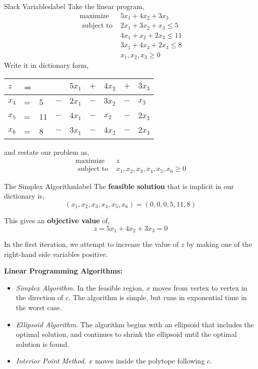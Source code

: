 	\begin{ex}{Slack Variables}{label}
		Take the linear program, 
		\[
		\begin{array}{cl}
		\operatorname{maximize} & 5 x_{1}+4 x_{2}+3 x_{3} \\
		\text { subject to } & 2 x_{1}+3 x_{2}+x_{3} \leq 5 \\
		& 4 x_{1}+x_{2}+2 x_{3} \leq 11 \\
		& 3 x_{1}+4 x_{2}+2 x_{3} \leq 8 \\
		& x_{1}, x_{2}, x_{3} \geq 0
		\end{array}
		\]
		\noindent Write it in dictionary form,

		\vphantom{.}

		\begin{center}
		\begin{tabular}{lllllllll}
		$z$   & = &    &     & $5x_1$ & $+$ & $4x_2$ & $+$ & $3x_3$ \\ \hline
		$x_4$ & = & 5  & $-$ & $2x_1$ & $-$ & $3x_2$ & $-$ & $x_3$  \\
		$x_5$ & = & 11 & $-$ & $4x_1$ & $-$ & $x_2$  & $-$ & $2x_3$ \\
		$x_6$ & = & 8  & $-$ & $3x_1$ & $-$ & $4x_2$ & $-$ & $2x_3$
		\end{tabular}
		\end{center}

		\vphantom{.}

		\noindent and restate our problem as,
		\[
		\begin{array}{cl}
		\operatorname{maximize} & z \\
		\text { subject to } & x_{1}, x_{2}, x_{3}, x_{4}, x_{5}, x_{6} \geq 0
		\end{array}
		\]
	\end{ex}

	\begin{ex}{The Simplex Algorithm}{label}
	The \textbf{feasible solution} that is implicit in our dictionary is,
	\[(x_1, x_2, x_3, x_4, x_5, x_6) = (0,0,0,5,11,8)\]

	This gives an \textbf{objective value} of,
	\[z = 5x_1 + 4x_2 + 3x_3 = 0\]

	In the first iteration, we attempt to increase the value of $z$ by making one of the right-hand side variables positive.
	\end{ex}

	\begin{marginfigure}
		\textbf{Linear Programming Algorithms:}
		\begin{itemize}
			\item \textit{Simplex Algorithm.} In the feasible region, $x$ moves from vertex to vertex in the direction of $c$. The algorithm is simple, but runs in exponential time in the worst case.
			\item \textit{Ellipsoid Algorithm.} The algorithm begins with an ellipsoid that includes the optimal solution, and continues to shrink the ellipsoid until the optimal solution is found.
			\item \textit{Interior Point Method.} $x$ moves inside the polytope following $c$.
		\end{itemize}
	\end{marginfigure}

